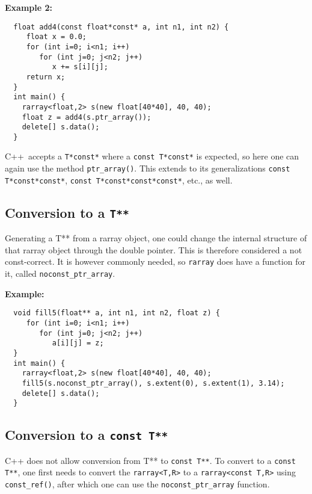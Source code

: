\documentclass[12pt,twoside]{article}
\newcommand{\cxx}{C{++}}
\begin{document}
\noindent
{\bf Example 2:}
\vspace{-5pt}\begin{framed}\vspace{-14pt}%
\begin{verbatim}
  float add4(const float*const* a, int n1, int n2) {
     float x = 0.0;
     for (int i=0; i<n1; i++)
        for (int j=0; j<n2; j++)
           x += s[i][j];
     return x;
  }
  int main() {
    rarray<float,2> s(new float[40*40], 40, 40);
    float z = add4(s.ptr_array());
    delete[] s.data();
  }
\end{verbatim}\vspace{-14pt}
\end{framed}

\noindent
\cxx\ accepts a \texttt{T*const*} where a \texttt{const T*const*} is expected, so here one can again use the method \texttt{ptr\_array()}.
This extends to its generalizations \texttt{const T*const*const*}, \texttt{const T*const*const*const*}, etc., as well.


\subsection{Conversion to a {\tt T**}}

\noindent
Generating a T** from a rarray object, one could change the internal structure of that rarray object through the double pointer.  This is therefore considered a not const-correct.  It is however commonly needed, so \texttt{rarray} does have a function for it, called \texttt{noconst\_ptr\_array}. 

\noindent
{\bf Example:}
\vspace{-5pt}\begin{framed}\vspace{-14pt}%
\begin{verbatim}
  void fill5(float** a, int n1, int n2, float z) {
     for (int i=0; i<n1; i++)
        for (int j=0; j<n2; j++)
           a[i][j] = z;
  }
  int main() {
    rarray<float,2> s(new float[40*40], 40, 40);
    fill5(s.noconst_ptr_array(), s.extent(0), s.extent(1), 3.14);
    delete[] s.data();
  }
\end{verbatim}\vspace{-14pt}
\end{framed}

\subsection{Conversion to a {\tt const T**}}
\noindent
C++ does not allow conversion from T** to \texttt{const T**}. To convert to a \texttt{const T**}, one first needs to convert the \texttt{rarray{\tt<}T,R{\tt>}} to a \texttt{rarray{\tt<}const T,R{\tt>}} using \texttt{const\_ref()}, after which one can use the \texttt{noconst\_ptr\_array} function.
\end{document}
